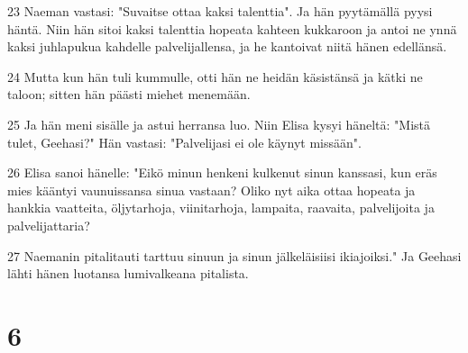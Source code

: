 \par 23 Naeman vastasi: "Suvaitse ottaa kaksi talenttia". Ja hän pyytämällä pyysi häntä. Niin hän sitoi kaksi talenttia hopeata kahteen kukkaroon ja antoi ne ynnä kaksi juhlapukua kahdelle palvelijallensa, ja he kantoivat niitä hänen edellänsä.
\par 24 Mutta kun hän tuli kummulle, otti hän ne heidän käsistänsä ja kätki ne taloon; sitten hän päästi miehet menemään.
\par 25 Ja hän meni sisälle ja astui herransa luo. Niin Elisa kysyi häneltä: "Mistä tulet, Geehasi?" Hän vastasi: "Palvelijasi ei ole käynyt missään".
\par 26 Elisa sanoi hänelle: "Eikö minun henkeni kulkenut sinun kanssasi, kun eräs mies kääntyi vaunuissansa sinua vastaan? Oliko nyt aika ottaa hopeata ja hankkia vaatteita, öljytarhoja, viinitarhoja, lampaita, raavaita, palvelijoita ja palvelijattaria?
\par 27 Naemanin pitalitauti tarttuu sinuun ja sinun jälkeläisiisi ikiajoiksi." Ja Geehasi lähti hänen luotansa lumivalkeana pitalista.

\chapter{6}

